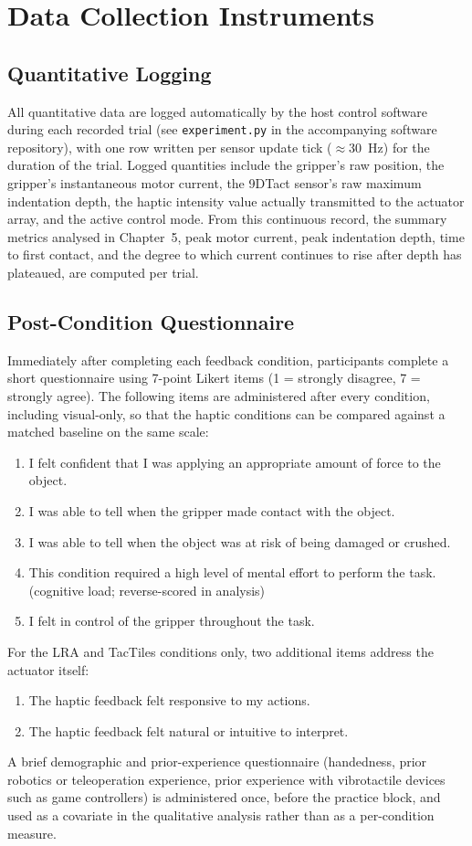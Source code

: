 \documentclass[12pt, a4paper]{report}
\begin{document}
\section{Data Collection Instruments}
\label{sec:instruments}
\subsection{Quantitative Logging}
\label{subsec:logging}
All quantitative data are logged automatically by the host control software during each recorded trial (see \texttt{experiment.py} in the accompanying software repository), with one row written per sensor update tick ($\approx$30~Hz) for the duration of the trial. Logged quantities include the gripper's raw position, the gripper's instantaneous motor current, the 9DTact sensor's raw maximum indentation depth, the haptic intensity value actually transmitted to the actuator array, and the active control mode. From this continuous record, the summary metrics analysed in Chapter~5, peak motor current, peak indentation depth, time to first contact, and the degree to which current continues to rise after depth has plateaued, are computed per trial.

\subsection{Post-Condition Questionnaire}
\label{subsec:questionnaire}
Immediately after completing each feedback condition, participants complete a short questionnaire using 7-point Likert items (1 = strongly disagree, 7 = strongly agree). The following items are administered after every condition, including visual-only, so that the haptic conditions can be compared against a matched baseline on the same scale:
\begin{enumerate}
    \item I felt confident that I was applying an appropriate amount of force to the object.
    \item I was able to tell when the gripper made contact with the object.
    \item I was able to tell when the object was at risk of being damaged or crushed.
    \item This condition required a high level of mental effort to perform the task. (cognitive load; reverse-scored in analysis)
    \item I felt in control of the gripper throughout the task.
\end{enumerate}
For the LRA and TacTiles conditions only, two additional items address the actuator itself:
\begin{enumerate}[resume]
    \item The haptic feedback felt responsive to my actions.
    \item The haptic feedback felt natural or intuitive to interpret.
\end{enumerate}
A brief demographic and prior-experience questionnaire (handedness, prior robotics or teleoperation experience, prior experience with vibrotactile devices such as game controllers) is administered once, before the practice block, and used as a covariate in the qualitative analysis rather than as a per-condition measure.
\end{document}
